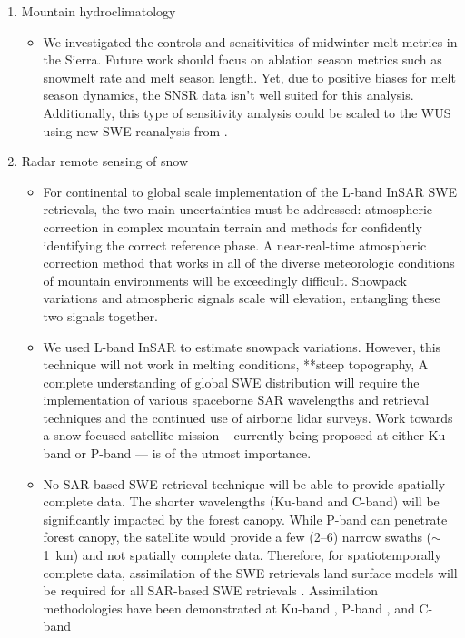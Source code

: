 \begin{enumerate}
   \item Mountain hydroclimatology
   \begin{itemize}
     \item We investigated the controls and sensitivities of midwinter melt metrics in the Sierra. Future work should focus on ablation season metrics such as snowmelt rate and melt season length. Yet, due to positive biases for melt season dynamics, the SNSR data isn't well suited for this analysis. Additionally, this type of sensitivity analysis could be scaled to the WUS using new SWE reanalysis from \citep{fangWesternUnitedStates2022}.
   \end{itemize}

   \item Radar remote sensing of snow
   \begin{itemize}

     \item For continental to global scale implementation of the L-band InSAR SWE retrievals, the two main uncertainties must be addressed: atmospheric correction in complex mountain terrain and methods for confidently identifying the correct reference phase. A near-real-time atmospheric correction method that works in all of the diverse meteorologic conditions of mountain environments will be exceedingly difficult. Snowpack variations and atmospheric signals scale will elevation, entangling these two signals together.

     \item We used L-band InSAR to estimate snowpack variations. However, this technique will not work in melting conditions, **steep topography, A complete understanding of global SWE distribution will require the implementation of various spaceborne SAR wavelengths and retrieval techniques and the continued use of airborne lidar surveys. Work towards a snow-focused satellite mission -- currently being proposed at either Ku-band \citep{tsangReviewArticleGlobal2022, garnaudQuantifyingSnowMass2019} or P-band \citep{shahRemoteSensingSnow2017} --- is of the utmost importance.

      \item No SAR-based SWE retrieval technique will be able to provide spatially complete data. The shorter wavelengths (Ku-band and C-band) will be significantly impacted by the forest canopy. While P-band can penetrate forest canopy, the satellite would provide a few (2--6) narrow swaths ($\sim$1~km) and not spatially complete data. Therefore, for spatiotemporally complete data, assimilation of the SWE retrievals land surface models will be required for all SAR-based SWE retrievals \citep{girottoDataAssimilationImproves2020}. Assimilation methodologies have been demonstrated at Ku-band \citep{wrzesienDevelopmentNatureRun2022, choEvaluatingUtilityActive2022}, P-band \citep{maEstimatingSpatiotemporallyContinuous2023}, and C-band \citep{gir}
    
   \end{itemize}
\end{enumerate}

